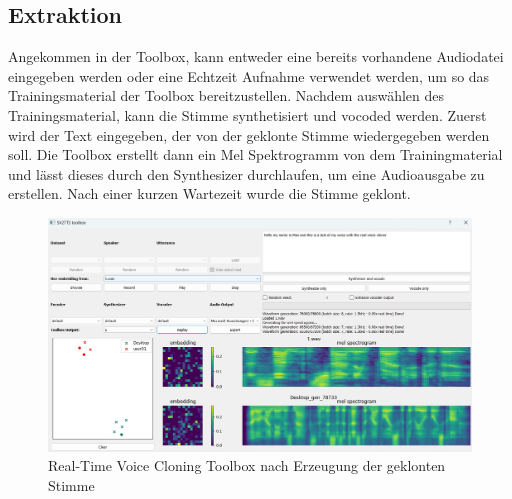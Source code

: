 \subsection{Extraktion}
Angekommen in der Toolbox, kann entweder eine bereits vorhandene Audiodatei eingegeben werden oder eine Echtzeit Aufnahme verwendet werden, um so das Trainingsmaterial der Toolbox bereitzustellen. Nachdem auswählen des Trainingsmaterial, kann die Stimme synthetisiert und vocoded werden. Zuerst wird der Text eingegeben, der von der geklonte Stimme wiedergegeben werden soll. Die Toolbox erstellt dann ein Mel Spektrogramm von dem Trainingmaterial und lässt dieses durch den Synthesizer durchlaufen, um eine Audioausgabe zu erstellen. Nach einer kurzen Wartezeit wurde die Stimme geklont.
\begin{figure}[H]
    \includegraphics[width=1.0\textwidth]{Bilder/AudioToolbox2}
    \centering
    \caption{Real-Time Voice Cloning Toolbox nach Erzeugung der geklonten Stimme}
    \label{fig:RTVCloningToolboxDurchfuehrung}
\end{figure}